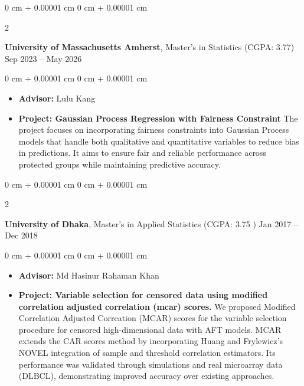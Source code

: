 \documentclass[10pt, letterpaper]{article}
\newenvironment{highlights}{
    \begin{itemize}[
        topsep=0.10 cm,
        parsep=0.10 cm,
        partopsep=0pt,
        itemsep=0pt,
        leftmargin=0 cm + 10pt
    ]
}{
    \end{itemize}
} %
\newenvironment{onecolentry}{
    \begin{adjustwidth}{
        0 cm + 0.00001 cm
    }{
        0 cm + 0.00001 cm
    }
}{
    \end{adjustwidth}
} %
\newenvironment{twocolentry}[2][]{
    \onecolentry
    \def\secondColumn{#2}
    \setcolumnwidth{\fill, 4.5 cm}
    \begin{paracol}{2}
}{
    \switchcolumn \raggedleft \secondColumn
    \end{paracol}
    \endonecolentry
} %
\begin{document}
        \begin{twocolentry}{
            Sep 2023 – May 2026
        }
            \textbf{University of Massachusetts Amherst}, Master's in Statistics (CGPA: 3.77) \end{twocolentry}

        \vspace{0.10 cm}
        \begin{onecolentry}
            \begin{highlights}
                \item \textbf{Advisor:} Lulu Kang
                \item \textbf{Project: Gaussian Process Regression with Fairness Constraint} The project focuses on incorporating fairness constraints into Gaussian Process models that handle both qualitative and quantitative variables to reduce bias in predictions. It aims to ensure fair and reliable performance across protected groups while maintaining predictive accuracy.
            \end{highlights}
        \end{onecolentry}

    \vspace{0.20 cm}
    \begin{twocolentry}{
            Jan 2017 – Dec 2018
        }
            \textbf{University of Dhaka}, Master's in Applied Statistics (CGPA: 3.75 )\end{twocolentry}
        \vspace{0.10 cm}
        \begin{onecolentry}
            \begin{highlights}
                \item \textbf{Advisor:} Md Hasinur Rahaman Khan
                \item  \textbf{Project: Variable selection for censored data using modified correlation adjusted correlation (mcar) scores.} 
                We proposed Modified Correlation Adjusted Correation (MCAR) scores for the variable selection procedure for censored high-dimensional data with AFT models. MCAR extends the CAR scores method by incorporating Huang and Frylewicz’s NOVEL integration of sample and threshold correlation estimators. Its performance was validated through simulations and real microarray data (DLBCL), demonstrating improved accuracy over existing approaches.
            \end{highlights}
        \end{onecolentry}
\end{document}
